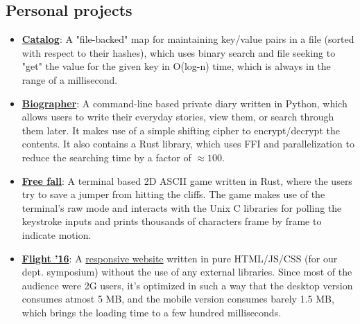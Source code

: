 \documentclass[11pt,a4paper,sans]{moderncv}        %
\newcommand\chref[3][linky]{\href{#2}{\color{#1}#3}}
\begin{document}
\subsection{Personal projects}
\begin{itemize}
\item \textbf{\chref{https://github.com/Wafflespeanut/rust-catalog}{Catalog}}: A "file-backed" map for maintaining key/value pairs in a file (sorted with respect to their hashes), which uses binary search and file seeking to "get" the value for the given key in O(log-n) time, which is always in the range of a millisecond.
\item \textbf{\chref{https://github.com/Wafflespeanut/biographer}{Biographer}}: A command-line based private diary written in Python, which allows users to write their everyday stories, view them, or search through them later. It makes use of a simple shifting cipher to encrypt/decrypt the contents. It also contains a Rust library, which uses FFI and parallelization to reduce the searching time by a factor of $\approx 100$.
\item \textbf{\chref{https://github.com/Wafflespeanut/free-fall}{Free fall}}: A terminal based 2D ASCII game written in Rust, where the users try to save a jumper from hitting the cliffs. The game makes use of the terminal's raw mode and interacts with the Unix C libraries for polling the keystroke inputs and prints thousands of characters frame by frame to indicate motion.
\item \textbf{\chref{https://github.com/Wafflespeanut/flight-2016}{Flight '16}}: A \chref{http://wafflespeanut.github.io/flight-2016}{responsive website} written in pure HTML/JS/CSS (for our dept. symposium) without the use of any external libraries. Since most of the audience were 2G users, it's optimized in such a way that the desktop version consumes atmost 5 MB, and the mobile version consumes barely 1.5 MB, which brings the loading time to a few hundred milliseconds.
\end{itemize}


\end{document}
